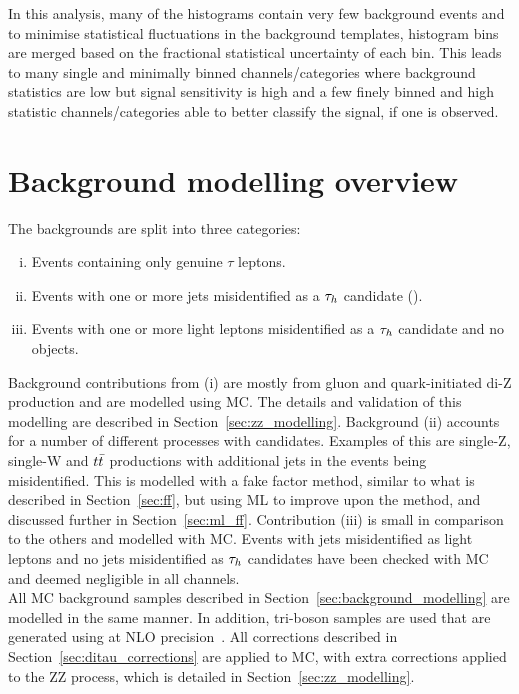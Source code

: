 In this analysis, many of the histograms contain very few background events and to minimise statistical fluctuations in the background templates, histogram bins are merged based on the fractional statistical uncertainty of each bin.
This leads to many single and minimally binned channels/categories where background statistics are low but signal sensitivity is high and a few finely binned and high statistic channels/categories able to better classify the signal, if one is observed.
 
\section{Background modelling overview}

The backgrounds are split into three categories:
\begin{enumerate}[i)]
  \item Events containing only genuine $\tau$ leptons.
  \item Events with one or more jets misidentified as a $\tau_{h}$ candidate (\jtth).
  \item Events with one or more light leptons misidentified as a $\tau_{h}$ candidate and no \jtth objects. 
\end{enumerate}

Background contributions from (i) are mostly from gluon and quark-initiated di-Z production and are modelled using \ac{MC}.
The details and validation of this modelling are described in Section~\ref{sec:zz_modelling}.
Background (ii) accounts for a number of different processes with \jtth candidates.
Examples of this are single-Z, single-W and $t\bar{t}$ productions with additional jets in the events being misidentified.
This is modelled with a fake factor method, similar to what is described in Section~\ref{sec:ff}, but using \ac{ML} to improve upon the method, and discussed further in Section~\ref{sec:ml_ff}.
Contribution (iii) is small in comparison to the others and modelled with \ac{MC}.
Events with jets misidentified as light leptons and no jets misidentified as $\tau_{h}$ candidates have been checked with \ac{MC} and deemed negligible in all channels. \\

All \ac{MC} background samples described in Section~\ref{sec:background_modelling} are modelled in the same manner.  
In addition, tri-boson samples are used that are generated using \MGvATNLO at \ac{NLO} precision~\cite{Alwall:2011uj}.
All corrections described in Section~\ref{sec:ditau_corrections} are applied to \ac{MC}, with extra corrections applied to the ZZ process, which is detailed in Section~\ref{sec:zz_modelling}.

